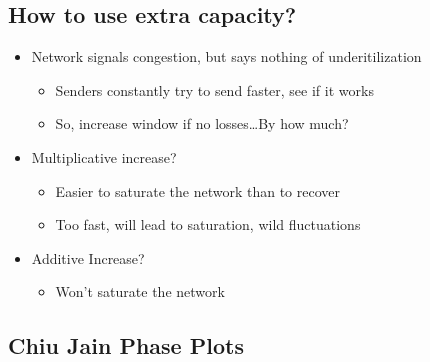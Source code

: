 \subsection{How to use extra capacity?}
\begin{itemize}[nosep]
    \item Network signals congestion, but says nothing of underitilization
          \begin{itemize}[nosep]
              \item Senders constantly try to send faster, see if it works
              \item So, increase window if no losses\dots By how much?
          \end{itemize}
    \item Multiplicative increase?
          \begin{itemize}[nosep]
              \item Easier to saturate the network than to recover
              \item Too fast, will lead to saturation, wild fluctuations
          \end{itemize}
    \item Additive Increase?
          \begin{itemize}[nosep]
              \item Won't saturate the network
          \end{itemize}
\end{itemize}

\subsection{Chiu Jain Phase Plots}
\begin{figure}[H]
\end{figure}

